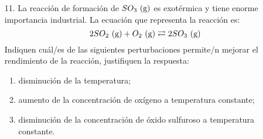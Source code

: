 \documentclass[../Práctica.root.tex]{subfiles}
\begin{document}
\begin{enumerate}
    \item[11.] La reacción de formación de $SO_3 \ \text{(g)}$ es exotérmica y tiene enorme importancia industrial.
          La ecuación que representa la reacción es:
          \[ 2 SO_2 \ \text{(g)} + O_2 \ \text{(g)} \rightleftarrows{} 2 SO_3 \ \text{(g)} \]
          Indiquen cuál/es de las siguientes perturbaciones permite/n mejorar el rendimiento de la
          reacción, justifiquen la respuesta:
          \begin{enumerate}
              \item disminución de la temperatura;
              \item aumento de la concentración de oxígeno a temperatura constante;
              \item disminución de la concentración de óxido sulfuroso a temperatura constante.
          \end{enumerate}

\end{enumerate}
\end{document}
